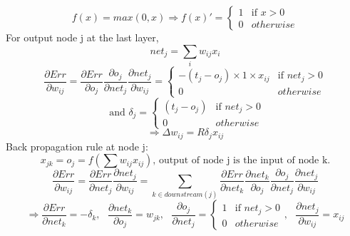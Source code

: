 \item[(a)]
\begin{equation*}
	f(x) = max(0,x)
\Rightarrow
	f(x)' = 
	\begin{cases}
	1 & \mbox{if } x > 0 \\
	0 & otherwise
	\end{cases}
\end{equation*}
For output node j at the last layer,
\begin{equation*}
	net_j =\sum_i w_{ij}x_i
\end{equation*}
\begin{equation*}
	\frac{\partial Err}{\partial w_{ij}} = 
	\frac{\partial Err}{\partial o_j}
	\frac{\partial o_j}{\partial net_j}
	\frac{\partial net_j}{\partial w_{ij}}=
	\begin{cases}
	-(t_j-o_j)\times 1 \times  x_{ij} & \mbox{if } net_j > 0 \\
	0 & otherwise
	\end{cases}
\end{equation*}
\begin{equation*}
	\mbox{ and } \delta_j = 
	\begin{cases}
	(t_j-o_j) & \mbox{if } net_j > 0 \\
	0 & otherwise
	\end{cases}
\end{equation*}
\begin{equation*}
	\Rightarrow \Delta w_{ij} = R\delta_jx_{ij}
\end{equation*}
Back propagation rule at node j:
\begin{equation*}
	x_{jk} = o_{j}= f(\sum w_{ij} x_{ij}) \mbox{, output of node j is the input of node k.}
\end{equation*}
\begin{equation*}
	\frac{\partial Err}{\partial w_{ij}} = 
	\frac{\partial Err}{\partial net_{j}}
	\frac{\partial net_{j}}{\partial w_{ij}}
	= \sum_{k \in downstream(j)}
	\frac{\partial Err}{\partial net_{k}}
	\frac{\partial net_{k}}{\partial o_{j}}
	\frac{\partial o_{j}}{\partial net_{j}}
	\frac{\partial net_{j}}{\partial w_{ij}} 
\end{equation*}
\begin{equation*}
	\Rightarrow
	\frac{\partial Err}{\partial net_{k}} = -\delta_k,\mbox{ }
	\frac{\partial net_{k}}{\partial o_{j}}= w_{jk},\mbox{ }
	\frac{\partial o_{j}}{\partial net_{j}}= 	
		\begin{cases}
			1 & \mbox{if } net_{j} > 0 \\
			0 & otherwise
		\end{cases},\mbox{ }
	\frac{\partial net_{j}}{\partial w_{ij}}=x_{ij}
\end{equation*}
